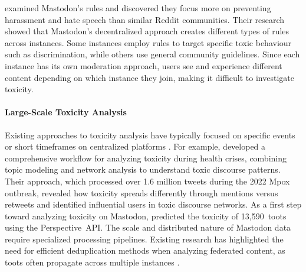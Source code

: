 \citet{nicholson:2023} examined Mastodon's rules and discovered they focus more on preventing harassment and hate speech than similar Reddit communities. Their research showed that Mastodon's decentralized approach creates different types of rules across instances. Some instances employ rules to target specific toxic behaviour such as discrimination, while others use general community guidelines. Since each instance has its own moderation approach, users see and experience different content depending on which instance they join, making it difficult to investigate toxicity.

\paragraph{Large-Scale Toxicity Analysis}
Existing approaches to toxicity analysis have typically focused on specific events or short timeframes on centralized platforms \cite{wulczyn:2017, fan:2022,georgakopoulos:2018,badjatiya:2017}. For example, \citet{fan:2022} developed a comprehensive workflow for analyzing toxicity during health crises, combining topic modeling and network analysis to understand toxic discourse patterns. Their approach, which processed over 1.6 million tweets during the 2022 Mpox outbreak, revealed how toxicity spreads differently through mentions versus retweets and identified influential users in toxic discourse networks. As a first step toward analyzing toxicity on Mastodon, \citet{al-khateeb:2022} predicted the toxicity of 13,590~toots using the Perspective~API. The scale and distributed nature of Mastodon data require specialized processing pipelines. Existing research has highlighted the need for efficient deduplication methods when analyzing federated content, as toots often propagate across multiple instances \cite{bono:2024}.